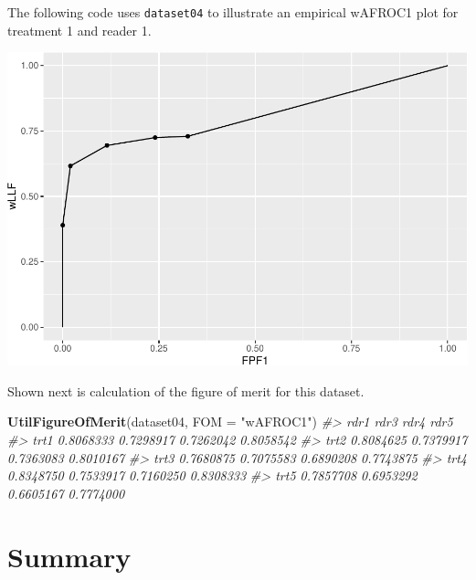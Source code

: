 \documentclass[
]{book}
\newenvironment{Shaded}{\begin{snugshade}}{\end{snugshade}}
\newcommand{\CommentTok}[1]{\textcolor[rgb]{0.56,0.35,0.01}{\textit{#1}}}
\newcommand{\DataTypeTok}[1]{\textcolor[rgb]{0.13,0.29,0.53}{#1}}
\newcommand{\DecValTok}[1]{\textcolor[rgb]{0.00,0.00,0.81}{#1}}
\newcommand{\KeywordTok}[1]{\textcolor[rgb]{0.13,0.29,0.53}{\textbf{#1}}}
\newcommand{\NormalTok}[1]{#1}
\newcommand{\OperatorTok}[1]{\textcolor[rgb]{0.81,0.36,0.00}{\textbf{#1}}}
\newcommand{\StringTok}[1]{\textcolor[rgb]{0.31,0.60,0.02}{#1}}
\begin{document}
The following code uses \texttt{dataset04} to illustrate an empirical wAFROC1 plot for treatment 1 and reader 1.

\begin{Shaded}
\end{Shaded}

\includegraphics{03-empirical_files/figure-latex/unnamed-chunk-34-1.pdf}

Shown next is calculation of the figure of merit for this dataset.

\begin{Shaded}
\begin{Highlighting}[]
\KeywordTok{UtilFigureOfMerit}\NormalTok{(dataset04, }\DataTypeTok{FOM =} \StringTok{"wAFROC1"}\NormalTok{)}
\CommentTok{#>           rdr1      rdr3      rdr4      rdr5}
\CommentTok{#> trt1 0.8068333 0.7298917 0.7262042 0.8058542}
\CommentTok{#> trt2 0.8084625 0.7379917 0.7363083 0.8010167}
\CommentTok{#> trt3 0.7680875 0.7075583 0.6890208 0.7743875}
\CommentTok{#> trt4 0.8348750 0.7533917 0.7160250 0.8308333}
\CommentTok{#> trt5 0.7857708 0.6953292 0.6605167 0.7774000}
\end{Highlighting}
\end{Shaded}

\hypertarget{empirical-summary}{%
\section{Summary}\label{empirical-summary}}
\end{document}
